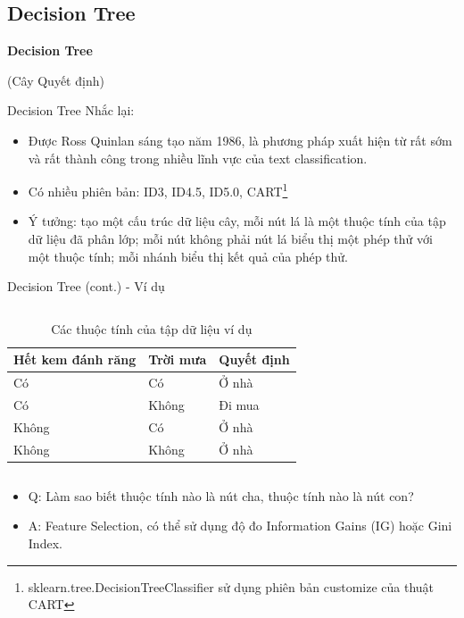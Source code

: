 \documentclass[aspectratio=169,xcolor=dvipsnames]{beamer}
\begin{document}
\subsection{Decision Tree}

\begin{frame}
	\Huge{\centerline{\textbf{Decision Tree}}}
	{\centerline{(Cây Quyết định)}}
\end{frame}

\begin{frame}{Decision Tree}
Nhắc lại:
\begin{itemize}
\item Được Ross Quinlan sáng tạo năm 1986\cite{DBLP:journals/ml/Quinlan86}, là phương pháp xuất hiện từ rất sớm và rất thành công trong nhiều lĩnh vực của text classification.
\item Có nhiều phiên bản: ID3, ID4.5, ID5.0, CART\footnote{sklearn.tree.DecisionTreeClassifier sử dụng phiên bản customize của thuật CART}
\item Ý tưởng: tạo một cấu trúc dữ liệu cây, mỗi nút lá là một thuộc tính của tập dữ liệu đã phân lớp; mỗi nút không phải nút lá biểu thị một phép thử với một thuộc tính; mỗi nhánh biểu thị kết quả của phép thử.
\end{itemize}
\end{frame}

\begin{frame}{Decision Tree (cont.) - Ví dụ}
\begin{columns}[c]
\begin{table}
\begin{tabular}{|l|l|l|}
	\hline
	Hết kem đánh răng & Trời mưa & Quyết định \\
	\hline
	Có & Có & Ở nhà \\
	Có & Không & Đi mua \\
	Không & Có & Ở nhà \\
	Không & Không & Ở nhà \\
	\hline
\end{tabular}
\caption{Các thuộc tính của tập dữ liệu ví dụ}
\end{table}
\end{columns}

\begin{itemize}
	\item Q: Làm sao biết thuộc tính nào là nút cha, thuộc tính nào là nút con?
	\item A: Feature Selection, có thể sử dụng độ đo Information Gains (IG) hoặc Gini Index.
\end{itemize}
\end{frame}
\end{document}
